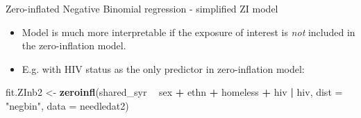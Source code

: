 \documentclass[
  ignorenonframetext,
]{beamer}
\newenvironment{Shaded}{\begin{snugshade}}{\end{snugshade}}
\newcommand{\DataTypeTok}[1]{\textcolor[rgb]{0.13,0.29,0.53}{#1}}
\newcommand{\KeywordTok}[1]{\textcolor[rgb]{0.13,0.29,0.53}{\textbf{#1}}}
\newcommand{\NormalTok}[1]{#1}
\newcommand{\OperatorTok}[1]{\textcolor[rgb]{0.81,0.36,0.00}{\textbf{#1}}}
\newcommand{\StringTok}[1]{\textcolor[rgb]{0.31,0.60,0.02}{#1}}
\providecommand{\tightlist}{%
  \setlength{\itemsep}{0pt}\setlength{\parskip}{0pt}}
\begin{document}
\begin{frame}[fragile]{Zero-inflated Negative Binomial regression -
simplified ZI model}
\protect\hypertarget{zero-inflated-negative-binomial-regression---simplified-zi-model}{}

\begin{itemize}
\tightlist
\item
  Model is much more interpretable if the exposure of interest is
  \emph{not} included in the zero-inflation model.
\item
  E.g. with HIV status as the only predictor in zero-inflation model:
\end{itemize}

\begin{Shaded}
\begin{Highlighting}[]
\NormalTok{fit.ZInb2 <-}\StringTok{ }\KeywordTok{zeroinfl}\NormalTok{(shared_syr }\OperatorTok{~}\StringTok{ }\NormalTok{sex }\OperatorTok{+}\StringTok{ }\NormalTok{ethn }\OperatorTok{+}\StringTok{ }\NormalTok{homeless }\OperatorTok{+}\StringTok{ }\NormalTok{hiv }\OperatorTok{|}\StringTok{ }\NormalTok{hiv,}
                      \DataTypeTok{dist =} \StringTok{"negbin"}\NormalTok{,}
                      \DataTypeTok{data =}\NormalTok{ needledat2)}
\end{Highlighting}
\end{Shaded}

\end{frame}
\end{document}
